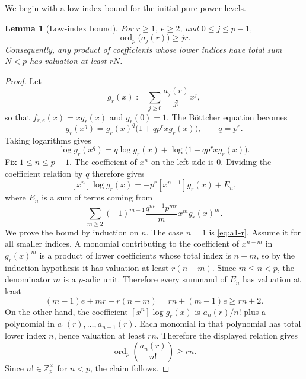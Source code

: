\documentclass[11pt]{amsart}
\numberwithin{equation}{section}
\newtheorem{lemma}[lemma]{Lemma}
\DeclareMathOperator{\ordop}{ord}
\newcommand{\Zp}{\mathbb{Z}_p}
\newcommand{\vp}{\ordop_p}
\begin{document}
We begin with a low-index bound for the initial pure-power levels.

\begin{lemma}[Low-index bound]\label{lem:low-index-pe}
For $r\ge1$, $e\ge2$, and $0\le j\le p-1$,
\[
        \vp\bigl(a_j(r)\bigr)\ge jr.
\]
Consequently, any product of coefficients whose lower indices have total sum $N<p$ has valuation at least $rN$.
\end{lemma}
\begin{proof}
Let
\[
        g_r(x):=\sum_{j\ge0}\frac{a_j(r)}{j!}x^j,
\]
so that $f_{r,e}(x)=xg_r(x)$ and $g_r(0)=1$.  The B\"ottcher equation becomes
\[
        g_r(x^q)=g_r(x)^q\bigl(1+qp^r xg_r(x)\bigr),\qquad q=p^e.
\]
Taking logarithms gives
\[
        \log g_r(x^q)=q\log g_r(x)+\log\bigl(1+qp^r xg_r(x)\bigr).
\]
Fix $1\le n\le p-1$.  The coefficient of $x^n$ on the left side is $0$.  Dividing the coefficient relation by $q$ therefore gives
\[
        [x^n]\log g_r(x)=-p^r[x^{n-1}]g_r(x)+E_n,
\]
where $E_n$ is a sum of terms coming from
\[
        \sum_{m\ge2}(-1)^{m-1}\frac{q^{m-1}p^{mr}}{m}x^m g_r(x)^m.
\]
We prove the bound by induction on $n$.  The case $n=1$ is \eqref{eq:a1-r}.  Assume it for all smaller indices.  A monomial contributing to the coefficient of $x^{n-m}$ in $g_r(x)^m$ is a product of lower coefficients whose total index is $n-m$, so by the induction hypothesis it has valuation at least $r(n-m)$.  Since $m\le n<p$, the denominator $m$ is a $p$-adic unit.  Therefore every summand of $E_n$ has valuation at least
\[
        (m-1)e+mr+r(n-m)=rn+(m-1)e\ge rn+2.
\]
On the other hand, the coefficient $[x^n]\log g_r(x)$ is $a_n(r)/n!$ plus a polynomial in $a_1(r),\ldots,a_{n-1}(r)$.  Each monomial in that polynomial has total lower index $n$, hence valuation at least $rn$.  Therefore the displayed relation gives
\[
        \vp\!\left(\frac{a_n(r)}{n!}\right)\ge rn.
\]
Since $n!\in\Zp^\times$ for $n<p$, the claim follows.
\end{proof}
\end{document}
